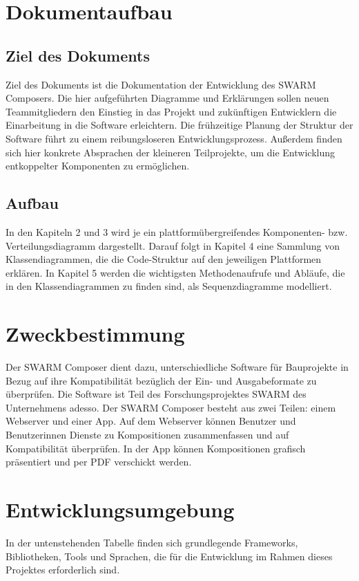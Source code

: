\section{Dokumentaufbau}\label{sec:dokumentaufbau}
\subsection{Ziel des Dokuments}
Ziel des Dokuments ist die Dokumentation der Entwicklung des SWARM Composers. 
Die hier aufgeführten Diagramme und Erklärungen sollen neuen Teammitgliedern den Einstieg in das Projekt und zukünftigen Entwicklern die Einarbeitung in die Software erleichtern.
Die frühzeitige Planung der Struktur der Software führt zu einem reibungsloseren Entwicklungsprozess. 
Außerdem finden sich hier konkrete Absprachen der kleineren Teilprojekte, um die Entwicklung entkoppelter Komponenten zu ermöglichen.
\subsection{Aufbau}
In den Kapiteln 2 und 3 wird je ein plattformübergreifendes Komponenten- bzw. Verteilungsdiagramm dargestellt. 
Darauf folgt in Kapitel 4 eine Sammlung von Klassendiagrammen, die die Code-Struktur auf den jeweiligen Plattformen erklären.
In Kapitel 5 werden die wichtigsten Methodenaufrufe und Abläufe, die in den Klassendiagrammen zu finden sind, als Sequenzdiagramme modelliert.


\section{Zweckbestimmung}\label{sec:zweckbestimmung}
Der SWARM Composer dient dazu, unterschiedliche Software für Bauprojekte in Bezug auf ihre Kompatibilität bezüglich der Ein- und Ausgabeformate zu überprüfen. 
Die Software ist Teil des Forschungsprojektes SWARM des Unternehmens adesso. 
Der SWARM Composer besteht aus zwei Teilen: einem Webserver und einer App. 
Auf dem Webserver können Benutzer und Benutzerinnen Dienste zu Kompositionen zusammenfassen und auf Kompatibilität überprüfen.
In der App können Kompositionen grafisch präsentiert und per PDF verschickt werden.
\section{Entwicklungsumgebung}\label{sec:entwicklungsumgebung}
In der untenstehenden Tabelle finden sich grundlegende Frameworks, Bibliotheken, Tools und Sprachen, die für die Entwicklung im Rahmen dieses Projektes erforderlich sind.


